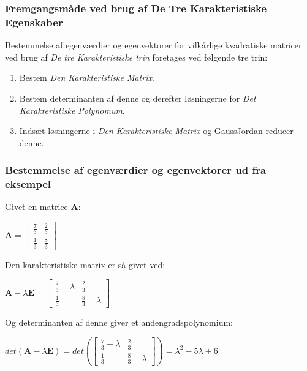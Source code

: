 \documentclass{article}
\newcommand{\cent}[1]{\begin{center}#1\end{center}}
\newcommand{\smallMatrix}[4]{\ensuremath{\begin{bmatrix}
			#1 & #2 \\
			#3 & #4
\end{bmatrix}}}
\begin{document}
  	\subsubsection{Fremgangsmåde ved brug af De Tre Karakteristiske Egenskaber}
  	
  	Bestemmelse af egenværdier og egenvektorer for vilkårlige kvadratiske matricer ved brug af \textit{De tre Karakteristiske trin} foretages ved følgende tre trin:
  	\begin{enumerate}
  		\item  Bestem \textit{Den Karakteristiske Matrix}.
  		\item Bestem determinanten af denne og derefter løsningerne for \textit{Det Karakteristiske Polynomum}.
  		\item Indsæt løsningerne i \textit{Den Karakteristiske Matrix} og GaussJordan reducer denne.
  	\end{enumerate}
  	
	\subsubsection{Bestemmelse af egenværdier og egenvektorer ud fra eksempel}
	
	Givet en matrice \textbf{A}:
	
	\cent{$ \textbf{A} = \smallMatrix{\frac{7}{3}}{\frac{2}{3}}{\frac{1}{3}}{\frac{8}{3}} $}
	
	Den karakteristiske matrix er så givet ved:
	
	\cent{$ \textbf{A}- \lambda \textbf{E} = \smallMatrix{\frac{7}{3}- \lambda}{\frac{2}{3}}{\frac{1}{3}}{\frac{8}{3}- \lambda} $}
	
	Og determinanten af denne giver et andengradspolynomium:
	
	\cent{$ det(\textbf{A}- \lambda \textbf{E}) = det(\smallMatrix{\frac{7}{3}- \lambda}{\frac{2}{3}}{\frac{1}{3}}{\frac{8}{3}- \lambda})= \lambda^2-5\lambda+6$}
	
\end{document}
